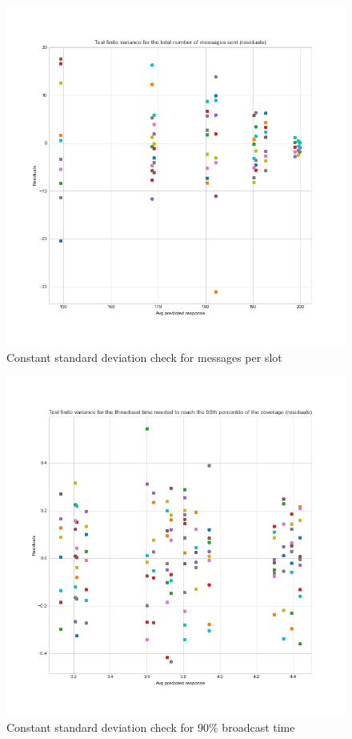 \begin{figure}
	\centering
	\includegraphics[width=\textwidth]
	{img/lowdensity2kr/assumptions/msgsPerSlot-variance.png}
	\caption{Constant standard deviation check for messages per
	slot}\label{fig:system}
\end{figure}

\begin{figure}
	\centering
	\includegraphics[width=\textwidth]
	{img/lowdensity2kr/assumptions/broadcastTime90-variance.png}
	\caption{Constant standard deviation check for \(90\%\) broadcast
	time}\label{fig:system}
\end{figure}

